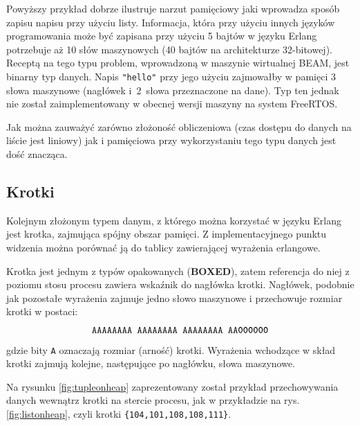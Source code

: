 Powyższy przykład dobrze ilustruje narzut pamięciowy jaki wprowadza sposób zapisu napisu przy użyciu listy. 
Informacja, która przy użyciu innych języków programowania może być zapisana przy użyciu 5 bajtów w języku Erlang potrzebuje aż 10 słów maszynowych (40 bajtów na architekturze 32-bitowej).
Receptą na tego typu problem, wprowadzoną w maszynie wirtualnej BEAM, jest binarny typ danych. Napis \texttt{"hello"} przy jego użyciu zajmowałby w pamięci 3 słowa maszynowe (nagłówek i~2~słowa przeznaczone na dane).
Typ ten jednak nie został zaimplementowany w obecnej wersji maszyny na system FreeRTOS.  

Jak można zauważyć zarówno złożoność obliczeniowa (czas dostępu do danych na liście jest liniowy) jak i pamięciowa przy wykorzystaniu tego typu danych jest dość znacząca.

\subsection{Krotki}
\label{sub:typyKrotki}

Kolejnym złożonym typem danym, z którego można korzystać w języku Erlang jest krotka, zajmująca spójny obszar pamięci. Z implementacyjnego punktu widzenia można porównać ją do tablicy zawierającej wyrażenia erlangowe.

Krotka jest jednym z typów opakowanych (\textbf{BOXED}), zatem referencja do niej z poziomu stosu procesu zawiera wskaźnik do nagłówka krotki. Nagłówek, podobnie jak pozostałe wyrażenia zajmuje jedno słowo maszynowe i przechowuje rozmiar krotki w postaci:
$$\texttt{AAAAAAAA AAAAAAAA AAAAAAAA AA\textbf{000000}}$$
gdzie bity \texttt{A} oznaczają rozmiar (arność) krotki. Wyrażenia wchodzące w skład krotki zajmują kolejne, następujące po nagłówku, słowa maszynowe.

Na rysunku \ref{fig:tupleonheap} zaprezentowany został przykład przechowywania danych wewnątrz krotki na stercie procesu, jak w przykładzie na rys. \ref{fig:listonheap}, czyli krotki \texttt{\{104,101,108,108,111\}}.

